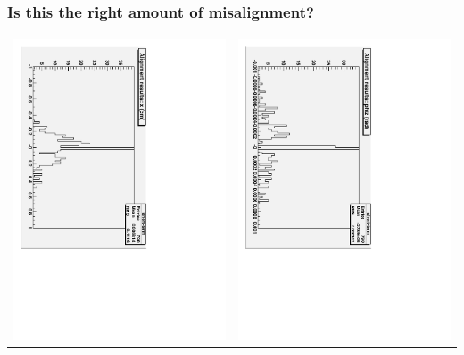 \documentclass[compress]{beamer}
\begin{document}
\begin{frame}
\frametitle{Is this the right amount of misalignment?}

\begin{center}
\begin{tabular}{p{0.5\linewidth} p{0.5\linewidth}}
\begin{minipage}{\linewidth}
\includegraphics[height=\linewidth, angle=90]{alignment_results_x.pdf}
\end{minipage} &
\begin{minipage}{\linewidth}
\includegraphics[height=\linewidth, angle=90]{alignment_results_phiz.pdf}

\end{minipage}
\end{tabular}
\end{center}
\end{frame}
\end{document}
